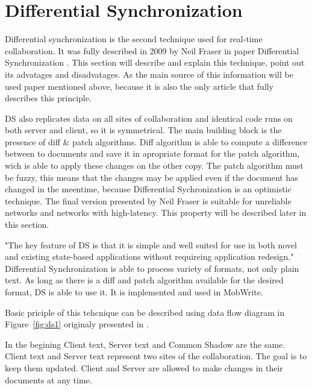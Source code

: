 \documentclass[12pt,oneside]{fithesis2}
\begin{document}
\section{Differential Synchronization}
\par Differential synchronization is the second technique used for real-time collaboration. It was fully described in 2009 by Neil Fraser in paper Differential Synchronization \cite{Fraser}. This section will describe and explain this technique, point out its advatages and disadvatages. As the main source of this information will be used paper mentioned above, because it is also the only article that fully describes this principle.
\par DS also replicates data on all sites of collaboration and identical code runs on both server and client, so it is symmetrical. The main building block is the presence of diff \& patch algorithms. Diff algorithm is able to compute a difference between to documents and save it in apropriate format for the patch algorithm, wich is able to apply these changes on the other copy. The patch algorithm must be fuzzy, this means that the changes may be applied even if the document has changed in the meentime, because Differential Sychronization is an optimistic technique. The final version presented by Neil Fraser is suitable for unreliable networks and networks with high-latency. This property will be described later in this section.
\par "The key feature of DS is that it is simple and well suited for use in both novel and existing state-based applications without requireing application redesign." \cite{Fraser} Differential Synchronization is able to process variety of formats, not only plain text. As long as there is a diff and patch algorithm available for the desired format, DS is able to use it. It is implemented and used in MobWrite. 
\par Basic priciple of this tehcnique can be described using data flow diagram in Figure~\ref{fig:ds1} originaly presented in \cite{Fraser}.  
\par In the begining Client text, Server text and Common Shadow are the same. Client text and Server text represent two sites of the collaboration. The goal is to keep them updated. Client and Server are allowed to make changes in their documents at any time. 
\end{document}
